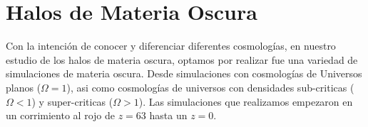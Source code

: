 \chapter{Halos de Materia Oscura}
\setcounter{equation}{0}

\noindent Con la intención de conocer y diferenciar diferentes cosmologías, en nuestro estudio de los halos de materia oscura, optamos por realizar fue una variedad de simulaciones de materia oscura. Desde simulaciones con cosmologías de Universos planos ($\Omega = 1$), asi como cosmologías  de universos con densidades sub-criticas ($\Omega < 1$) y super-criticas ($\Omega > 1$). Las simulaciones que realizamos empezaron en un corrimiento al rojo de $z=63$ hasta un $z=0$.
